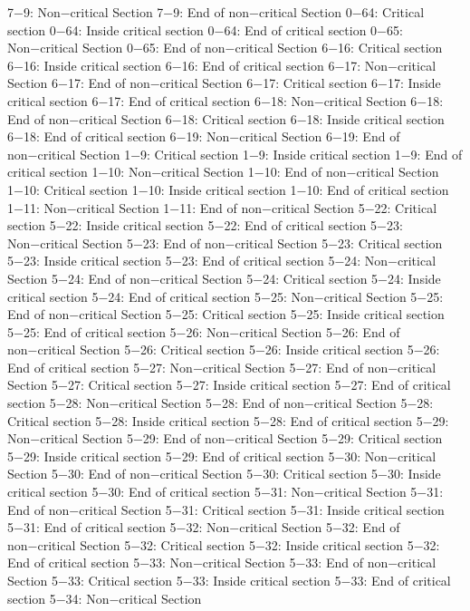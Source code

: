 7−9: Non−critical Section
7−9: End of non−critical Section
0−64: Critical section
0−64: Inside critical section
0−64: End of critical section
0−65: Non−critical Section
0−65: End of non−critical Section
6−16: Critical section
6−16: Inside critical section
6−16: End of critical section
6−17: Non−critical Section
6−17: End of non−critical Section
6−17: Critical section
6−17: Inside critical section
6−17: End of critical section
6−18: Non−critical Section
6−18: End of non−critical Section
6−18: Critical section
6−18: Inside critical section
6−18: End of critical section
6−19: Non−critical Section
6−19: End of non−critical Section
1−9: Critical section
1−9: Inside critical section
1−9: End of critical section
1−10: Non−critical Section
1−10: End of non−critical Section
1−10: Critical section
1−10: Inside critical section
1−10: End of critical section
1−11: Non−critical Section
1−11: End of non−critical Section
5−22: Critical section
5−22: Inside critical section
5−22: End of critical section
5−23: Non−critical Section
5−23: End of non−critical Section
5−23: Critical section
5−23: Inside critical section
5−23: End of critical section
5−24: Non−critical Section
5−24: End of non−critical Section
5−24: Critical section
5−24: Inside critical section
5−24: End of critical section
5−25: Non−critical Section
5−25: End of non−critical Section
5−25: Critical section
5−25: Inside critical section
5−25: End of critical section
5−26: Non−critical Section
5−26: End of non−critical Section
5−26: Critical section
5−26: Inside critical section
5−26: End of critical section
5−27: Non−critical Section
5−27: End of non−critical Section
5−27: Critical section
5−27: Inside critical section
5−27: End of critical section
5−28: Non−critical Section
5−28: End of non−critical Section
5−28: Critical section
5−28: Inside critical section
5−28: End of critical section
5−29: Non−critical Section
5−29: End of non−critical Section
5−29: Critical section
5−29: Inside critical section
5−29: End of critical section
5−30: Non−critical Section
5−30: End of non−critical Section
5−30: Critical section
5−30: Inside critical section
5−30: End of critical section
5−31: Non−critical Section
5−31: End of non−critical Section
5−31: Critical section
5−31: Inside critical section
5−31: End of critical section
5−32: Non−critical Section
5−32: End of non−critical Section
5−32: Critical section
5−32: Inside critical section
5−32: End of critical section
5−33: Non−critical Section
5−33: End of non−critical Section
5−33: Critical section
5−33: Inside critical section
5−33: End of critical section
5−34: Non−critical Section
